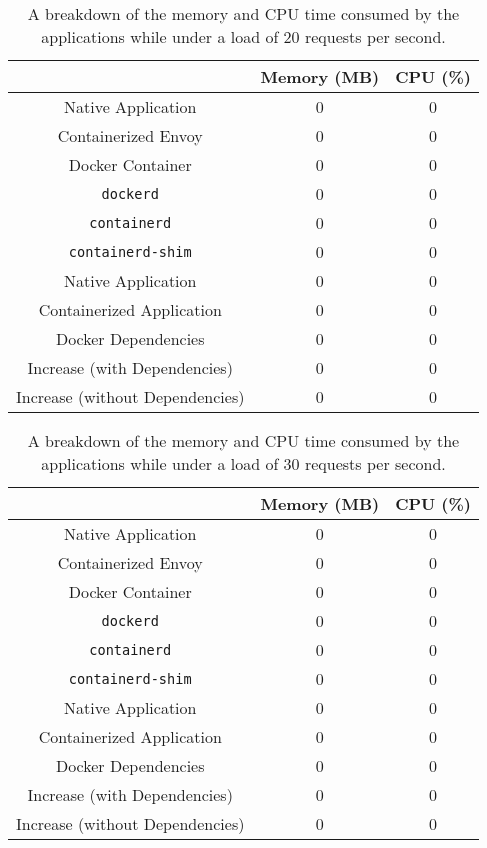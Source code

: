 \documentclass{article}
\begin{document}
\begin{table}[H]
\begin{tabular}{ |c|c|c| }
 \hline
   & Memory (MB) & CPU (\%) \\ 
 \hline
 Native Application & 0 & 0 \\
 \hline
 Containerized Envoy & 0 & 0 \\
 \hline
 Docker Container & 0 & 0 \\
 \hline
 \texttt{dockerd} & 0 & 0 \\
 \hline
 \texttt{containerd} & 0 & 0 \\
 \hline
 \texttt{containerd-shim} & 0 & 0 \\
 \hline\hline
 Native Application & 0 & 0 \\
 \hline
 Containerized Application & 0 & 0 \\
 \hline
 Docker Dependencies & 0 & 0 \\
 \hline\hline
 Increase (with Dependencies) & 0 & 0 \\
 \hline
 Increase (without Dependencies) & 0 & 0 \\
 \hline
\end{tabular}
\caption{A breakdown of the memory and CPU time consumed by the applications while under a load of 20 requests per second.}
\label{consumption-breakdown-under-load-20}
\end{table}

\begin{table}[H]
\begin{tabular}{ |c|c|c| }
 \hline
   & Memory (MB) & CPU (\%) \\ 
 \hline
 Native Application & 0 & 0 \\
 \hline
 Containerized Envoy & 0 & 0 \\
 \hline
 Docker Container & 0 & 0 \\
 \hline
 \texttt{dockerd} & 0 & 0 \\
 \hline
 \texttt{containerd} & 0 & 0 \\
 \hline
 \texttt{containerd-shim} & 0 & 0 \\
 \hline\hline
 Native Application & 0 & 0 \\
 \hline
 Containerized Application & 0 & 0 \\
 \hline
 Docker Dependencies & 0 & 0 \\
 \hline\hline
 Increase (with Dependencies) & 0 & 0 \\
 \hline
 Increase (without Dependencies) & 0 & 0 \\
 \hline
\end{tabular}
\caption{A breakdown of the memory and CPU time consumed by the applications while under a load of 30 requests per second.}
\label{consumption-breakdown-under-load-30}
\end{table}
\end{document}
